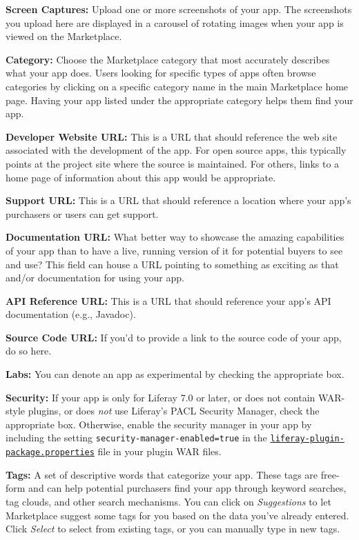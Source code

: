 \textbf{Screen Captures:} Upload one or more screenshots of your app.
The screenshots you upload here are displayed in a carousel of rotating
images when your app is viewed on the Marketplace.

\textbf{Category:} Choose the Marketplace category that most accurately
describes what your app does. Users looking for specific types of apps
often browse categories by clicking on a specific category name in the
main Marketplace home page. Having your app listed under the appropriate
category helps them find your app.

\textbf{Developer Website URL:} This is a URL that should reference the
web site associated with the development of the app. For open source
apps, this typically points at the project site where the source is
maintained. For others, links to a home page of information about this
app would be appropriate.

\textbf{Support URL:} This is a URL that should reference a location
where your app's purchasers or users can get support.

\textbf{Documentation URL:} What better way to showcase the amazing
capabilities of your app than to have a live, running version of it for
potential buyers to see and use? This field can house a URL pointing to
something as exciting as that and/or documentation for using your app.

\textbf{API Reference URL:} This is a URL that should reference your
app's API documentation (e.g., Javadoc).

\textbf{Source Code URL:} If you'd to provide a link to the source code
of your app, do so here.

\textbf{Labs:} You can denote an app as experimental by checking the
appropriate box.

\textbf{Security:} If your app is only for Liferay 7.0 or later, or does
not contain WAR-style plugins, or does \emph{not} use Liferay's PACL
Security Manager, check the appropriate box. Otherwise, enable the
security manager in your app by including the setting
\texttt{security-manager-enabled=true} in the
\href{http://docs.liferay.com/portal/6.2/propertiesdoc/liferay-plugin-package_6_2_0.properties.html}{\texttt{liferay-plugin-package.properties}}
file in your plugin WAR files.

\textbf{Tags:} A set of descriptive words that categorize your app.
These tags are free-form and can help potential purchasers find your app
through keyword searches, tag clouds, and other search mechanisms. You
can click on \emph{Suggestions} to let Marketplace suggest some tags for
you based on the data you've already entered. Click \emph{Select} to
select from existing tags, or you can manually type in new tags.

